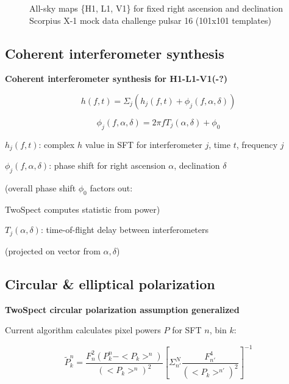 \begin{figure}
\begin{center}
\caption{ All-sky maps \{H1, L1, V1\} for fixed right ascension and declination
\newline Scorpius X-1 mock data challenge pulsar 16 (101x101 templates)
}
\end{center}
\end{figure}



\subsection{Coherent interferometer synthesis}


\textbf{Coherent interferometer synthesis for H1-L1-V1(-?)}


\[
h(f,t)=\Sigma_{j}\left(h_{j}(f,t)+\phi_{j}(f,\alpha,\delta)\right)
\]



\[
\phi_{j}(f,\alpha,\delta)=2\pi fT_{j}(\alpha,\delta)+\phi_{0}
\]



\emph{$h_{j}(f,t)$}: complex $h$ value in SFT for interferometer
$j$, time $t$, frequency $j$


$\phi_{j}(f,\alpha,\delta)$: phase shift for right ascension $\alpha$,
declination $\delta$


(overall phase shift $\phi_{0}$ factors out: 


TwoSpect computes statistic from power)


$T_{j}(\alpha,\delta)$: time-of-flight delay between interferometers 


(projected on vector from $\alpha,\delta$)


\subsection{Circular \& elliptical polarization}


\textbf{TwoSpect circular polarization assumption generalized}


Current algorithm calculates pixel powers $P$ for SFT $n$, bin $k$:


\[
\tilde{P}_{k}^{n}=\frac{F_{n}^{2}(P_{k}^{n}-<P_{k}>^{n})}{(<P_{k}>^{n})^{2}}\left[\Sigma_{n'}^{N}\frac{F_{n'}^{4}}{(<P_{k}>^{n'})^{2}}\right]^{-1}
\]



